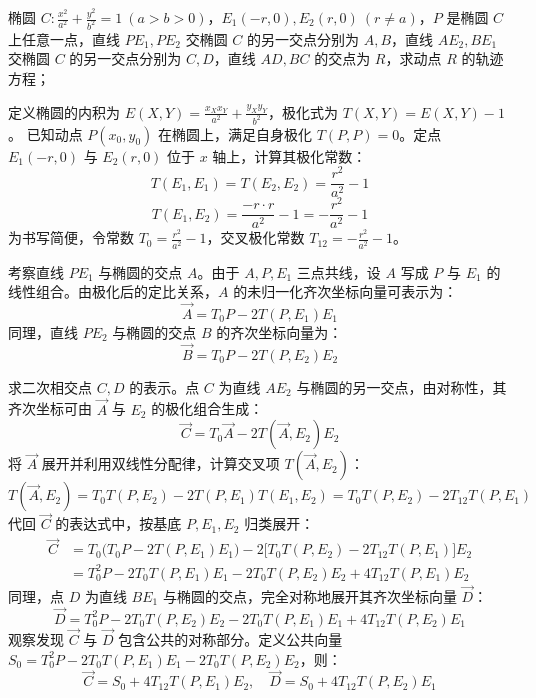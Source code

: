 \begin{exercise}
椭圆 \(C: \frac{x^2}{a^2} + \frac{y^2}{b^2} = 1\ (a > b > 0)\)，\(E_1(-r,0), E_2(r,0)\ (r \neq a)\)，\(P\) 是椭圆 \(C\) 上任意一点，直线 \(PE_1, PE_2\) 交椭圆 \(C\) 的另一交点分别为 \(A, B\)，直线 \(AE_2, BE_1\) 交椭圆 \(C\) 的另一交点分别为 \(C, D\)，直线 \(AD, BC\) 的交点为 \(R\)，求动点 \(R\) 的轨迹方程；
\end{exercise}
\begin{solution}
定义椭圆的内积为 $E(X,Y) = \frac{x_X x_Y}{a^2} + \frac{y_X y_Y}{b^2}$，极化式为 $T(X,Y) = E(X,Y) - 1$。
已知动点 $P(x_0, y_0)$ 在椭圆上，满足自身极化 $T(P,P) = 0$。定点 $E_1(-r,0)$ 与 $E_2(r,0)$ 位于 $x$ 轴上，计算其极化常数：
$$ T(E_1, E_1) = T(E_2, E_2) = \frac{r^2}{a^2} - 1 $$
$$ T(E_1, E_2) = \frac{-r \cdot r}{a^2} - 1 = -\frac{r^2}{a^2} - 1 $$
为书写简便，令常数 $T_0 = \frac{r^2}{a^2} - 1$，交叉极化常数 $T_{12} = -\frac{r^2}{a^2} - 1$。

考察直线 $PE_1$ 与椭圆的交点 $A$。由于 $A, P, E_1$ 三点共线，设 $A$ 写成 $P$ 与 $E_1$ 的线性组合。由极化后的定比关系，$A$ 的未归一化齐次坐标向量可表示为：
$$ \vec{A} = T_0 P - 2T(P,E_1) E_1 $$
同理，直线 $PE_2$ 与椭圆的交点 $B$ 的齐次坐标向量为：
$$ \vec{B} = T_0 P - 2T(P,E_2) E_2 $$

求二次相交点 $C, D$ 的表示。点 $C$ 为直线 $AE_2$ 与椭圆的另一交点，由对称性，其齐次坐标可由 $\vec{A}$ 与 $E_2$ 的极化组合生成：
$$ \vec{C} = T_0 \vec{A} - 2T(\vec{A}, E_2) E_2 $$
将 $\vec{A}$ 展开并利用双线性分配律，计算交叉项 $T(\vec{A}, E_2)$：
$$ T(\vec{A}, E_2) = T_0 T(P,E_2) - 2T(P,E_1)T(E_1, E_2) = T_0 T(P,E_2) - 2T_{12} T(P,E_1) $$
代回 $\vec{C}$ 的表达式中，按基底 $P, E_1, E_2$ 归类展开：
\begin{align*}
\vec{C} &= T_0 \big( T_0 P - 2T(P,E_1) E_1 \big) - 2\big[ T_0 T(P,E_2) - 2T_{12} T(P,E_1) \big] E_2 \\
&= T_0^2 P - 2T_0 T(P,E_1) E_1 - 2T_0 T(P,E_2) E_2 + 4T_{12} T(P,E_1) E_2
\end{align*}
同理，点 $D$ 为直线 $BE_1$ 与椭圆的交点，完全对称地展开其齐次坐标向量 $\vec{D}$：
$$ \vec{D} = T_0^2 P - 2T_0 T(P,E_2) E_2 - 2T_0 T(P,E_1) E_1 + 4T_{12} T(P,E_2) E_1 $$
观察发现 $\vec{C}$ 与 $\vec{D}$ 包含公共的对称部分。定义公共向量 $S_0 = T_0^2 P - 2T_0 T(P,E_1) E_1 - 2T_0 T(P,E_2) E_2$，则：
$$ \vec{C} = S_0 + 4T_{12} T(P,E_1) E_2, \quad \vec{D} = S_0 + 4T_{12} T(P,E_2) E_1 $$


\end{solution}
